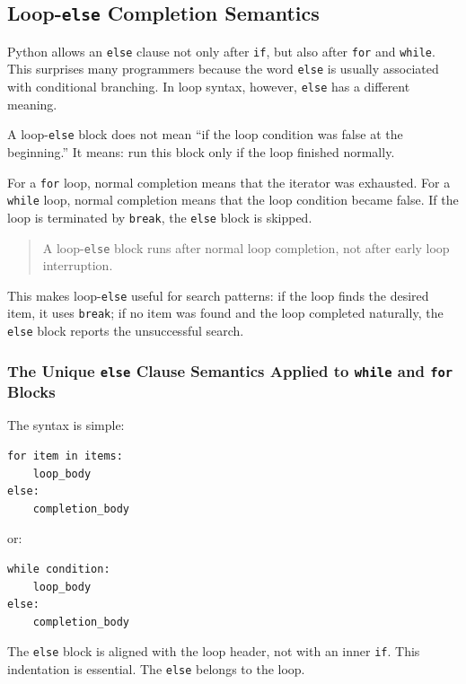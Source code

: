 \subsection{Loop-\texttt{else} Completion Semantics}

Python allows an \texttt{else} clause not only after \texttt{if}, but also after \texttt{for} and \texttt{while}. This surprises many programmers because the word \texttt{else} is usually associated with conditional branching. In loop syntax, however, \texttt{else} has a different meaning.

A loop-\texttt{else} block does not mean ``if the loop condition was false at the beginning.'' It means: run this block only if the loop finished normally.

For a \texttt{for} loop, normal completion means that the iterator was exhausted. For a \texttt{while} loop, normal completion means that the loop condition became false. If the loop is terminated by \texttt{break}, the \texttt{else} block is skipped.

\begin{quote}
A loop-\texttt{else} block runs after normal loop completion, not after early loop interruption.
\end{quote}

This makes loop-\texttt{else} useful for search patterns: if the loop finds the desired item, it uses \texttt{break}; if no item was found and the loop completed naturally, the \texttt{else} block reports the unsuccessful search.

\subsubsection{The Unique \texttt{else} Clause Semantics Applied to \texttt{while} and \texttt{for} Blocks}

The syntax is simple:

\begin{verbatim}
for item in items:
    loop_body
else:
    completion_body
\end{verbatim}

or:

\begin{verbatim}
while condition:
    loop_body
else:
    completion_body
\end{verbatim}

The \texttt{else} block is aligned with the loop header, not with an inner \texttt{if}. This indentation is essential. The \texttt{else} belongs to the loop.

